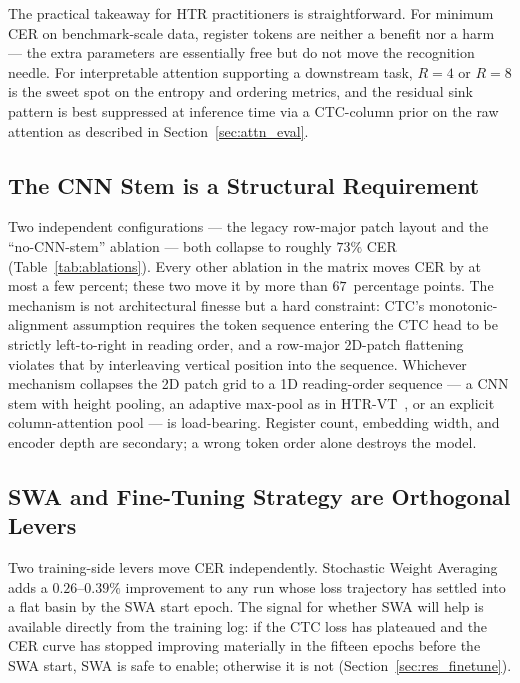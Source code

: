 The practical takeaway for HTR practitioners is straightforward. For minimum CER on benchmark-scale data, register tokens are neither a benefit nor a harm --- the extra parameters are essentially free but do not move the recognition needle. For interpretable attention supporting a downstream task, $R = 4$ or $R = 8$ is the sweet spot on the entropy and ordering metrics, and the residual sink pattern is best suppressed at inference time via a CTC-column prior on the raw attention as described in Section~\ref{sec:attn_eval}.

\subsection{The CNN Stem is a Structural Requirement}
\label{sec:disc_cnnstem}

Two independent configurations --- the legacy row-major patch layout and the ``no-CNN-stem'' ablation --- both collapse to roughly $73\%$ CER (Table~\ref{tab:ablations}). Every other ablation in the matrix moves CER by at most a few percent; these two move it by more than $67$~percentage points. The mechanism is not architectural finesse but a hard constraint: CTC's monotonic-alignment assumption requires the token sequence entering the CTC head to be strictly left-to-right in reading order, and a row-major 2D-patch flattening violates that by interleaving vertical position into the sequence. Whichever mechanism collapses the 2D patch grid to a 1D reading-order sequence --- a CNN stem with height pooling, an adaptive max-pool as in HTR-VT~\cite{li2024htrvt}, or an explicit column-attention pool --- is load-bearing. Register count, embedding width, and encoder depth are secondary; a wrong token order alone destroys the model.

\subsection{SWA and Fine-Tuning Strategy are Orthogonal Levers}
\label{sec:disc_swa_ft}

Two training-side levers move CER independently. Stochastic Weight Averaging~\cite{izmailov2018swa} adds a $0.26$--$0.39\%$ improvement to any run whose loss trajectory has settled into a flat basin by the SWA start epoch. The signal for whether SWA will help is available directly from the training log: if the CTC loss has plateaued and the CER curve has stopped improving materially in the fifteen epochs before the SWA start, SWA is safe to enable; otherwise it is not (Section~\ref{sec:res_finetune}).

